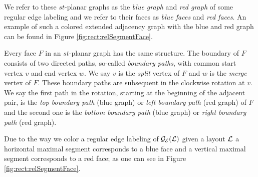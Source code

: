     We refer to these $st$-planar graphs as the \emph{blue graph} and \emph{red graph} of some regular edge labeling and we refer to their faces as \emph{blue faces} and \emph{red faces}. An example of such a colored extended adjacency graph with the blue and red graph can be found in Figure \ref{fig:rect:relSegmentFace}.

    Every face $F$ in an $st$-planar graph has the same structure. The boundary of $F$ consists of two directed paths, so-called \emph{boundary paths}, with common start vertex $v$ and end vertex $w$. We say $v$ is the \emph{split} vertex of $F$ and $w$ is the \emph{merge} vertex of $F$.
    These boundary paths are subsequent in the clockwise rotation at $v$. We say the first path in the rotation, starting at the beginning of the adjacent pair, is the \emph{top boundary path} (blue graph) or \emph{left boundary path} (red graph) of $F$ and the second one is the \emph{bottom boundary path} (blue graph) or \emph{right boundary path} (red graph).


    Due to the way we color a regular edge labeling of $\mathcal{G}_{\mathcal{E}}(\mathcal{L})$ given a layout $\mathcal{L}$ a horizontal maximal segment corresponds to a blue face and a vertical maximal segment corresponds to a red face; as one can see in Figure \ref{fig:rect:relSegmentFace}.

